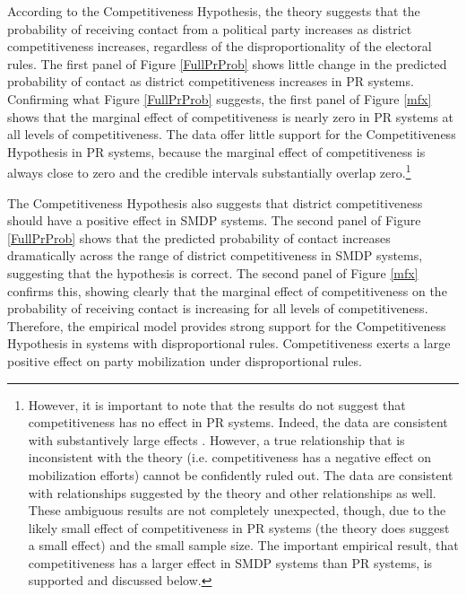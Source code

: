 \documentclass[12pt]{article}
\begin{document}
According to the Competitiveness Hypothesis, the theory suggests that the probability of receiving contact from a political party increases as district competitiveness increases, regardless of the disproportionality of the electoral rules. The first panel of Figure \ref{FullPrProb} shows little change in the predicted probability of contact as district competitiveness increases in PR systems. Confirming what Figure \ref{FullPrProb} suggests, the first panel of Figure \ref{mfx} shows that the marginal effect of competitiveness is nearly zero in PR systems at all levels of competitiveness. The data offer little support for the Competitiveness Hypothesis in PR systems, because the marginal effect of competitiveness is always close to zero and the credible intervals substantially overlap zero.\footnote{\label{fn:noeffect}However, it is important to note that the results do not suggest that competitiveness has no effect in PR systems. Indeed, the data are consistent with substantively large effects \citep{Rainey2014}. However, a true relationship that is inconsistent with the theory (i.e. competitiveness has a negative effect on mobilization efforts) cannot be confidently ruled out. The data are consistent with relationships suggested by the theory and other relationships as well. These ambiguous results are not completely unexpected, though, due to the likely small effect of competitiveness in PR systems (the theory does suggest a small effect) and the small sample size. The important empirical result, that competitiveness has a larger effect in SMDP systems than PR systems, is supported and discussed below.}

The Competitiveness Hypothesis also suggests that district competitiveness should have a positive effect in SMDP systems. The second panel of Figure \ref{FullPrProb} shows that the predicted probability of contact increases dramatically across the range of district competitiveness in SMDP systems, suggesting that the hypothesis is correct. The second panel of Figure \ref{mfx} confirms this, showing clearly that the marginal effect of competitiveness on the probability of receiving contact is increasing for all levels of competitiveness. Therefore, the empirical model provides strong support for the Competitiveness Hypothesis in systems with disproportional rules. Competitiveness exerts a large positive effect on party mobilization under disproportional rules.
\end{document}
